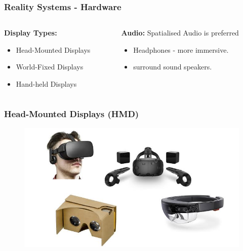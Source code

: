 \begin{frame}
	\frametitle{Reality Systems - Hardware}
	
	\begin{columns}
		
		\begin{column}{0.5\textwidth}
			\textbf{Display Types:}
			\begin{itemize}
				\item Head-Mounted Displays
				\item World-Fixed Displays
				\item Hand-held Displays
			\end{itemize}
		\end{column}
		
		\begin{column}{0.5\textwidth}

			\textbf{Audio:}
			Spatialised Audio is preferred
			\begin{itemize}
				\item Headphones - more immersive.
				\item surround sound speakers.
			\end{itemize}
			
		\end{column}
		
	\end{columns}
\end{frame}

\begin{frame}
	\frametitle{Head-Mounted Displays (HMD)}
	\begin{figure}
		\includegraphics[scale=0.4]{assets/hmd.png}
	\end{figure}
\end{frame}

